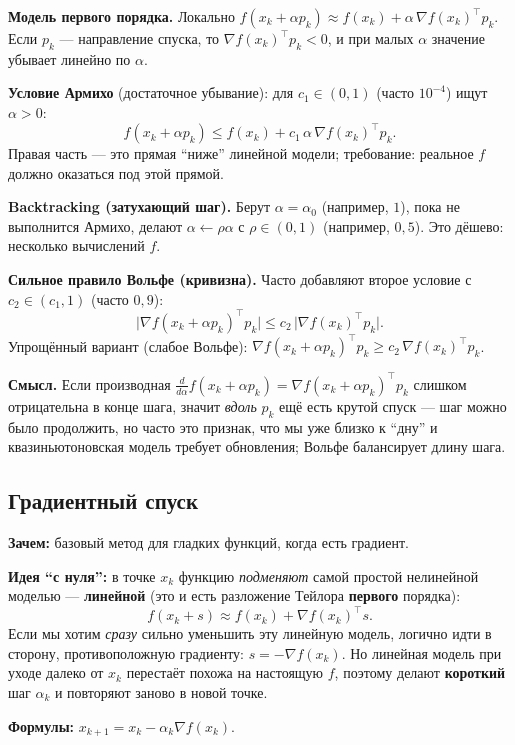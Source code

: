 \documentclass[12pt,a4paper]{article}
\newcommand{\grad}{\nabla}
\begin{document}
\textbf{Модель первого порядка.} Локально \(f(x_k+\alpha p_k)\approx f(x_k)+\alpha\,\grad f(x_k)^\top p_k\). Если \(p_k\) --- направление спуска, то \(\grad f(x_k)^\top p_k<0\), и при малых \(\alpha\) значение убывает линейно по \(\alpha\).

\textbf{Условие Армихо} (достаточное убывание): для \(c_1\in(0,1)\) (часто \(10^{-4}\)) ищут \(\alpha>0\):
\[
  f(x_k+\alpha p_k)\le f(x_k)+c_1\,\alpha\,\grad f(x_k)^\top p_k.
\]
Правая часть --- это прямая ``ниже'' линейной модели; требование: реальное \(f\) должно оказаться под этой прямой.

\textbf{Backtracking (затухающий шаг).} Берут \(\alpha=\alpha_0\) (например, \(1\)), пока не выполнится Армихо, делают \(\alpha\leftarrow\rho\alpha\) с \(\rho\in(0,1)\) (например, \(0{,}5\)). Это дёшево: несколько вычислений \(f\).

\textbf{Сильное правило Вольфе (кривизна).} Часто добавляют второе условие с \(c_2\in(c_1,1)\) (часто \(0{,}9\)):
\[
  \bigl|\grad f(x_k+\alpha p_k)^\top p_k\bigr|\le c_2\,\bigl|\grad f(x_k)^\top p_k\bigr|.
\]
Упрощённый вариант (слабое Вольфе): \(\grad f(x_k+\alpha p_k)^\top p_k \ge c_2\,\grad f(x_k)^\top p_k\).

\textbf{Смысл.} Если производная \(\frac{d}{d\alpha}f(x_k+\alpha p_k)=\grad f(x_k+\alpha p_k)^\top p_k\) слишком отрицательна в конце шага, значит \emph{вдоль} \(p_k\) ещё есть крутой спуск --- шаг можно было продолжить, но часто это признак, что мы уже близко к ``дну'' и квазиньютоновская модель требует обновления; Вольфе балансирует длину шага.

\subsection{Градиентный спуск}
\textbf{Зачем:} базовый метод для гладких функций, когда есть градиент.

\textbf{Идея ``с нуля'':} в точке \(x_k\) функцию \emph{подменяют} самой простой нелинейной моделью --- \textbf{линейной} (это и есть разложение Тейлора \textbf{первого} порядка):
\[
  f(x_k+s)\approx f(x_k)+\grad f(x_k)^\top s.
\]
Если мы хотим \emph{сразу} сильно уменьшить эту линейную модель, логично идти в сторону, противоположную градиенту: \(s=-\grad f(x_k)\). Но линейная модель при уходе далеко от \(x_k\) перестаёт похожа на настоящую \(f\), поэтому делают \textbf{короткий} шаг \(\alpha_k\) и повторяют заново в новой точке.

\textbf{Формулы:} \(x_{k+1}=x_k-\alpha_k\grad f(x_k)\).
\end{document}
